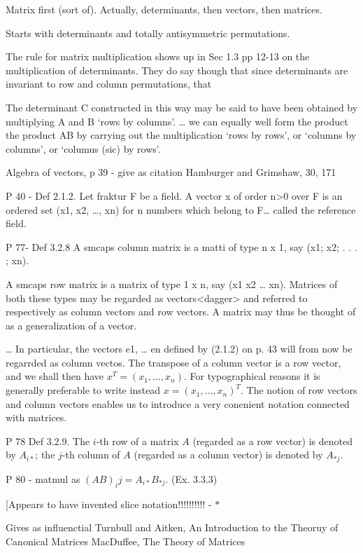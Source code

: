 Matrix first (sort of). Actually, determinants, then vectors, then matrices.

Starts with determinants and totally antisymmetric permutations.

The rule for matrix multiplication shows up in Sec 1.3 pp 12-13 on the multiplication of determinants. They do say though that since determinants are invariant to row and column permutations, that

The determinant C constructed in this way may be said to have been obtained by multiplying A and B ‘rows by columns’. … we can equally well form the product the product AB by carrying out the multiplication ‘rows by rows’, or ‘columns by columns’, or ‘columus (sic) by rows’.

Algebra of vectors, p 39 - give as citation Hamburger and Grimshaw, 30, 171

P 40 - Def 2.1.2. Let fraktur F be a field. A vector x of order n>0 over F is an ordered set (x1, x2, …, xn) for n numbers which belong to F… called the reference field.

P 77- Def 3.2.8 A smcaps column matrix is a matti of type n x 1, say (x1; x2; . . . ; xn).

A smcaps row matrix is a matrix of type 1 x n, say
(x1 x2 … xn).
Matrices of both these types may be regarded as vectors<dagger> and referred to respectively as column vectors and row vectors. A matrix may thus be thought of as a generalization of a vector.

… In particular, the vectors e1, … en defined by (2.1.2) on p. 43 will from now be regarrded as column vectos.
The transpose of a column vector is a row vector, and we shall then have $x^T = (x_1, \ldots, x_n)$. For typographical reasons it is generally preferable to write instead $x = (x_1, \ldots, x_n)^T$. The notion of row vectors and column vectors enables us to introduce a very conenient notation connected with matrices.

P 78 Def 3.2.9. The $i$-th row of a matrix $A$ (regarded as a row vector) is denoted by $A_{i\ast}$; the $j$-th column of $A$ (regarded as a column vector) is denoted by $A_{\ast j}$.

P 80 - matmul as $(AB)_ij = A_{i\ast} B_{\ast j}$. (Ex. 3.3.3)

[Appears to have invented slice notation!!!!!!!!!! - $\ast$

Gives as influenctial
Turnbull and Aitken, An Introduction to the Theoruy of Canonical Matrices
MacDuffee, The Theory of Matrices


